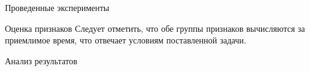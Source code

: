 \begin{section}{Проведенные эксперименты}
\begin{subsection}{Оценка признаков}
Следует отметить, что обе группы признаков вычисляются за приемлимое время, что отвечает условиям поставленной задачи.
\end{subsection}


\begin{subsection}{Анализ результатов}

\end{subsection}









\end{section}
